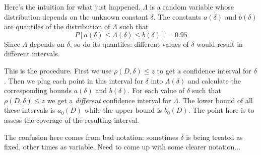 Here's the intuition for what just happened. $\Lambda$ is a random variable whose distribution depends on the unknown constant $\delta$. The constants $a(\delta)$ and $b(\delta)$ are quantiles of the distribution of $\Lambda$ such that 
	$$P\left[a(\delta) \leq \Lambda(\delta) \leq b(\delta)\right] = 0.95$$
Since $\Lambda$ depends on $\delta$, so do its quantiles: different values of $\delta$ would result in different intervals. 

This is the procedure. First we use $\rho(D,\delta)\leq z$ to get a confidence interval for $\delta$. Then we plug each point in this interval for $\delta$ into $\Lambda(\delta)$ and calculate the corresponding bounds $a(\delta)$ and $b(\delta)$. For each value of $\delta$ such that $\rho(D,\delta)\leq z$ we get a \emph{different} confidence interval for $\Lambda$. The lower bound of all these intervals is $a_0(D)$ while the upper bound is $b_0(D)$. The point here is to assess the coverage of the resulting interval.

The confusion here comes from bad notation: sometimes $\delta$ is being treated as fixed, other times as variable. Need to come up with some clearer notation...








